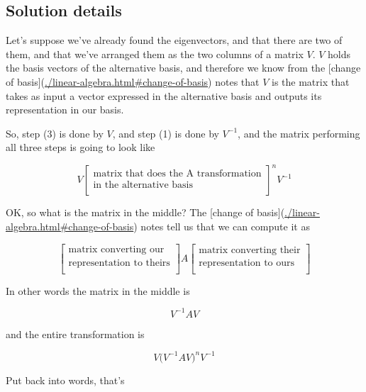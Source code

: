 \subsection{Solution details}

Let's suppose we've already found the eigenvectors, and that there are two of
them, and that we've arranged them as the two columns of a matrix $V$. $V$ holds
the basis vectors of the alternative basis, and therefore we know from the
[change of basis](\url{./linear-algebra.html#change-of-basis}) notes that $V$ is the
matrix that takes as input a vector expressed in the alternative basis and
outputs its representation in our basis.

So, step (3) is done by $V$, and step (1) is done by $V^{-1}$, and the matrix
performing all three steps is going to look like

$$
V
\begin{bmatrix}\text{matrix that does the A transformation}\\\text{in the alternative basis} \\ \end{bmatrix}^n
V^{-1}
$$

OK, so what is the matrix in the middle? The
[change of basis](\url{./linear-algebra.html#change-of-basis}) notes tell us that we
can compute it as

$$
\begin{bmatrix}\text{matrix converting our}\\\text{representation to theirs} \\ \end{bmatrix}
A
\begin{bmatrix}\text{matrix converting their}\\\text{representation to ours} \\ \end{bmatrix}
$$

In other words the matrix in the middle is

$$
V^{-1}AV
$$

and the entire transformation is

$$
V
\Big(V^{-1}AV\Big)^n
V^{-1}
$$

Put back into words, that's

